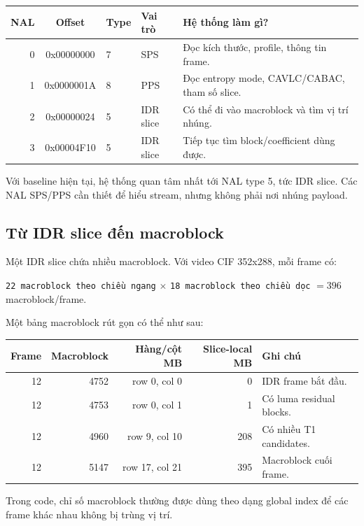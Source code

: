 \documentclass[11pt,a4paper]{article}
\begin{document}
\begin{center}
\begin{tabular}{rcllp{45mm}}
\toprule
NAL & Offset & Type & Vai trò & Hệ thống làm gì? \\
\midrule
0 & 0x00000000 & 7 & SPS & Đọc kích thước, profile, thông tin frame. \\
1 & 0x0000001A & 8 & PPS & Đọc entropy mode, CAVLC/CABAC, tham số slice. \\
2 & 0x00000024 & 5 & IDR slice & Có thể đi vào macroblock và tìm vị trí nhúng. \\
3 & 0x00004F10 & 5 & IDR slice & Tiếp tục tìm block/coefficient dùng được. \\
\bottomrule
\end{tabular}
\end{center}

Với baseline hiện tại, hệ thống quan tâm nhất tới NAL type 5, tức IDR slice.
Các NAL SPS/PPS cần thiết để hiểu stream, nhưng không phải nơi nhúng payload.

\subsection{Từ IDR slice đến macroblock}

Một IDR slice chứa nhiều macroblock. Với video CIF 352x288, mỗi frame có:

\begin{center}
\texttt{22 macroblock theo chiều ngang} \(\times\)
\texttt{18 macroblock theo chiều dọc}
\(= 396\) macroblock/frame.
\end{center}

Một bảng macroblock rút gọn có thể như sau:

\begin{center}
\begin{tabular}{rrrrp{46mm}}
\toprule
Frame & Macroblock & Hàng/cột MB & Slice-local MB & Ghi chú \\
\midrule
12 & 4752 & row 0, col 0 & 0 & IDR frame bắt đầu. \\
12 & 4753 & row 0, col 1 & 1 & Có luma residual blocks. \\
12 & 4960 & row 9, col 10 & 208 & Có nhiều T1 candidates. \\
12 & 5147 & row 17, col 21 & 395 & Macroblock cuối frame. \\
\bottomrule
\end{tabular}
\end{center}

Trong code, chỉ số macroblock thường được dùng theo dạng global index để các
frame khác nhau không bị trùng vị trí.
\end{document}
